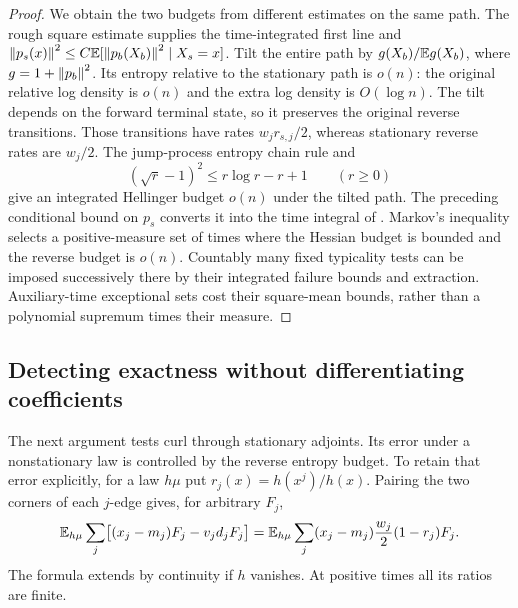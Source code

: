 \begin{proof}
We obtain the two budgets from different estimates on the same path.
The rough square estimate supplies the time-integrated first line and
$\left\lVert p_s(x)\right\rVert^2\le C\mathbb E[\left\lVert p_b(X_b)\right\rVert^2\mid X_s=x]$.
Tilt the entire path by
$g(X_b)/\mathbb E g(X_b)$, where $g=1+\left\lVert p_b\right\rVert^2$.
Its entropy relative to the stationary path is $o(n)$: the original
relative log density is $o(n)$ and the extra log density is $O(\log n)$.
The tilt depends on the forward terminal state, so it preserves the
original reverse transitions.  Those transitions have rates
$w_jr_{s,j}/2$, whereas stationary reverse rates are $w_j/2$.
The jump-process entropy chain rule and
\[
 (\sqrt r-1)^2\le r\log r-r+1\qquad(r\ge0)
\]
give an integrated Hellinger budget $o(n)$ under the tilted path.
The preceding conditional bound on $p_s$ converts it into the time
integral of .  Markov's inequality selects
a positive-measure set of times where the Hessian budget is bounded and
the reverse budget is $o(n)$.  Countably many fixed typicality tests can
be imposed successively there by their integrated failure bounds and
extraction.  Auxiliary-time exceptional sets cost their square-mean
bounds, rather than a polynomial supremum times their measure.
\end{proof}

\subsection{Detecting exactness without differentiating coefficients}

The next argument tests curl through stationary adjoints.  Its error
under a nonstationary law is controlled by the reverse entropy budget.
To retain that error explicitly, for a law $h\mu$ put
$r_j(x)=h(x^j)/h(x)$.  Pairing the two corners of
each $j$-edge gives, for arbitrary $F_j$,
\begin{equation}\label{eq:exact-nonstationary-ibp}
 \mathbb E_{h\mu}\sum_j\bigl[(x_j-m_j)F_j-v_jd_jF_j\bigr]
 =\mathbb E_{h\mu}\sum_j
 (x_j-m_j)\frac{w_j}{2}(1-r_j)F_j.
\end{equation}
The formula extends by continuity if $h$ vanishes.  At positive times
all its ratios are finite.

